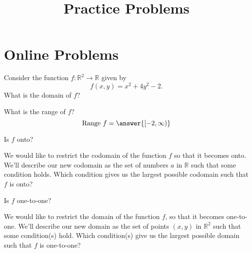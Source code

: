 \documentclass{ximera}
\title{Practice Problems}
\begin{document}
\begin{abstract}
\end{abstract}
\maketitle
\section{Online Problems}
\begin{problem}
Consider the function $f:\mathbb{R}^2\rightarrow\mathbb{R}$ given by
\[
f(x,y) = x^2+4y^2 -2.
\]
What is the domain of $f$?
\begin{multipleChoice}
\choice{$[0,\infty)$}
\end{multipleChoice}

What is the range of $f$?
\[
\textrm{Range }f = \answer{[-2,\infty)}
\]

Is $f$ onto?
\begin{multipleChoice}
\end{multipleChoice}

\begin{problem}
We would like to restrict the codomain of the function $f$ so that it becomes onto. We'll describe our new codomain as the set of numbers $a$ in $\mathbb{R}$ such that some condition holds. Which condition gives us the largest possible codomain such that $f$ is onto?
\begin{multipleChoice}
\end{multipleChoice}
\end{problem}

Is $f$ one-to-one?
\begin{multipleChoice}
\end{multipleChoice}

\begin{problem}
We would like to restrict the domain of the function $f$, so that it becomes one-to-one. We'll describe our new domain as the set of points $(x,y)$ in $\mathbb{R}^2$ such that some condition(s) hold. Which condition(s) give us the largest possible domain such that $f$ is one-to-one?
\begin{selectAll}
\end{selectAll}
\end{problem}
\end{problem}
\end{document}
